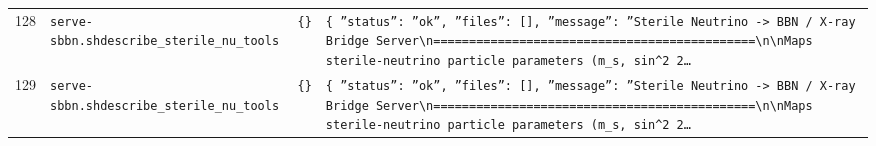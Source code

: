 \documentclass[11pt,a4paper]{article}
\begin{document}
\begin{longtable}{@{}p{}p{}p{}p{}@{}}
128 & \texttt{serve-sbbn.sh}\newline\texttt{describe\_\allowbreak{}sterile\_\allowbreak{}nu\_\allowbreak{}tools} & \texttt{\{\}\allowbreak{}} & \texttt{\{   ''status'':\allowbreak{} ''ok'',\allowbreak{}   ''files'':\allowbreak{} []\allowbreak{},\allowbreak{}   ''message'':\allowbreak{} ''Sterile Neutrino -\textgreater{}\allowbreak{} BBN /\allowbreak{} X-ray Bridge Server\textbackslash{}\allowbreak{}n=\allowbreak{}=\allowbreak{}=\allowbreak{}=\allowbreak{}=\allowbreak{}=\allowbreak{}=\allowbreak{}=\allowbreak{}=\allowbreak{}=\allowbreak{}=\allowbreak{}=\allowbreak{}=\allowbreak{}=\allowbreak{}=\allowbreak{}=\allowbreak{}=\allowbreak{}=\allowbreak{}=\allowbreak{}=\allowbreak{}=\allowbreak{}=\allowbreak{}=\allowbreak{}=\allowbreak{}=\allowbreak{}=\allowbreak{}=\allowbreak{}=\allowbreak{}=\allowbreak{}=\allowbreak{}=\allowbreak{}=\allowbreak{}=\allowbreak{}=\allowbreak{}=\allowbreak{}=\allowbreak{}=\allowbreak{}=\allowbreak{}=\allowbreak{}=\allowbreak{}=\allowbreak{}=\allowbreak{}=\allowbreak{}=\allowbreak{}=\allowbreak{}\textbackslash{}\allowbreak{}n\textbackslash{}\allowbreak{}nMaps sterile-neutrino particle parameters (m\_\allowbreak{}s,\allowbreak{} sin\textasciicircum{}\allowbreak{}2 2\ldots{}\allowbreak{}} \\
129 & \texttt{serve-sbbn.sh}\newline\texttt{describe\_\allowbreak{}sterile\_\allowbreak{}nu\_\allowbreak{}tools} & \texttt{\{\}\allowbreak{}} & \texttt{\{   ''status'':\allowbreak{} ''ok'',\allowbreak{}   ''files'':\allowbreak{} []\allowbreak{},\allowbreak{}   ''message'':\allowbreak{} ''Sterile Neutrino -\textgreater{}\allowbreak{} BBN /\allowbreak{} X-ray Bridge Server\textbackslash{}\allowbreak{}n=\allowbreak{}=\allowbreak{}=\allowbreak{}=\allowbreak{}=\allowbreak{}=\allowbreak{}=\allowbreak{}=\allowbreak{}=\allowbreak{}=\allowbreak{}=\allowbreak{}=\allowbreak{}=\allowbreak{}=\allowbreak{}=\allowbreak{}=\allowbreak{}=\allowbreak{}=\allowbreak{}=\allowbreak{}=\allowbreak{}=\allowbreak{}=\allowbreak{}=\allowbreak{}=\allowbreak{}=\allowbreak{}=\allowbreak{}=\allowbreak{}=\allowbreak{}=\allowbreak{}=\allowbreak{}=\allowbreak{}=\allowbreak{}=\allowbreak{}=\allowbreak{}=\allowbreak{}=\allowbreak{}=\allowbreak{}=\allowbreak{}=\allowbreak{}=\allowbreak{}=\allowbreak{}=\allowbreak{}=\allowbreak{}=\allowbreak{}=\allowbreak{}\textbackslash{}\allowbreak{}n\textbackslash{}\allowbreak{}nMaps sterile-neutrino particle parameters (m\_\allowbreak{}s,\allowbreak{} sin\textasciicircum{}\allowbreak{}2 2\ldots{}\allowbreak{}} \\

\end{longtable}
\end{document}
